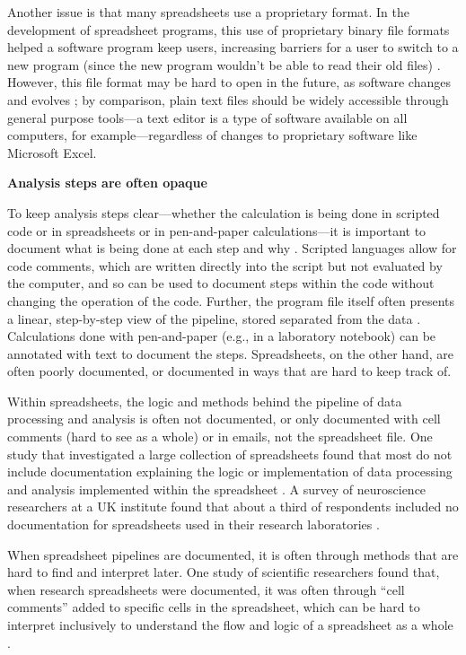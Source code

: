 \documentclass[]{tufte-book}
\begin{document}
Another issue is that many spreadsheets use a proprietary format. In the
development of spreadsheet programs, this use of proprietary binary file formats
helped a software program keep users, increasing barriers for a user to switch
to a new program (since the new program wouldn't be able to read their old
files) \citep{campbell2007number}. However, this file format may be hard to open in
the future, as software changes and evolves \citep{michener2015ten}; by comparison,
plain text files should be widely accessible through general purpose tools---a
text editor is a type of software available on all computers, for
example---regardless of changes to proprietary software like Microsoft Excel.

\textbf{Analysis steps are often opaque}

To keep analysis steps clear---whether the calculation is being done in scripted
code or in spreadsheets or in pen-and-paper calculations---it is important to
document what is being done at each step and why \citep{goodman2014ten}. Scripted
languages allow for code comments, which are written directly into the script
but not evaluated by the computer, and so can be used to document steps within
the code without changing the operation of the code. Further, the program file
itself often presents a linear, step-by-step view of the pipeline, stored
separated from the data \citep{creeth1985microcomputer}. Calculations done
with pen-and-paper (e.g., in a laboratory notebook) can be annotated with text
to document the steps. Spreadsheets, on the other hand, are often poorly
documented, or documented in ways that are hard to keep track of.

Within spreadsheets, the logic and methods behind the pipeline of data
processing and analysis is often not documented, or only documented with cell
comments (hard to see as a whole) or in emails, not the spreadsheet file.
One study that investigated a large collection of spreadsheets found that most
do not include documentation explaining the logic or implementation of data
processing and analysis implemented within the spreadsheet
\citep{hermans2016spreadsheets}. A survey of neuroscience researchers at a UK
institute found that about a third of respondents included no documentation
for spreadsheets used in their research laboratories \citep{altarawneh2017pilot}.

When spreadsheet pipelines are documented, it is often through methods that are
hard to find and interpret later. One study of scientific researchers found
that, when research spreadsheets were documented, it was often through ``cell
comments'' added to specific cells in the spreadsheet, which can be hard to
interpret inclusively to understand the flow and logic of a spreadsheet as a
whole \citep{altarawneh2017pilot}.
\end{document}
